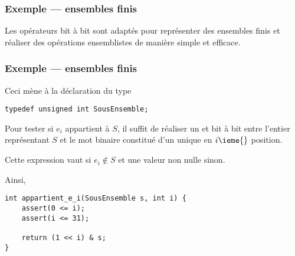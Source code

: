 \begin{frame} \frametitle{Exemple --- ensembles finis}
Les opérateurs bit à bit sont adaptés pour représenter des ensembles
finis et réaliser des opérations ensemblistes de manière simple et
efficace.
\bigskip



\end{frame}

\begin{frame}[fragile] \frametitle{Exemple --- ensembles finis}
Ceci mène à la déclaration du type
\begin{lstlisting}
typedef unsigned int SousEnsemble;
\end{lstlisting}
\medskip

Pour tester si $e_i$ appartient à $S$, il suffit de réaliser un et bit
à bit entre l'entier représentant $S$ et le mot binaire constitué d'un
unique  en $i\ieme{}$ position.
\smallskip

Cette expression vaut  si $e_i \notin S$ et une valeur non nulle
sinon.
\medskip

Ainsi,
\begin{lstlisting}
int appartient_e_i(SousEnsemble s, int i) {
    assert(0 <= i);
    assert(i <= 31);

    return (1 << i) & s;
}
\end{lstlisting}

\end{frame}

